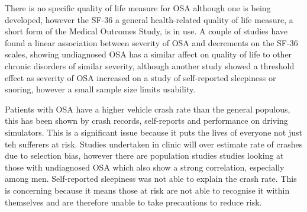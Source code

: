 There is no specific quality of life measure for OSA although one is being developed, however the SF-36 a general health-related quality of life measure, a short form of the Medical Outcomes Study, is in use. A couple of studies have found a linear association between severity of OSA and decrements on the SF-36 scales, showing undiagnosed OSA has a similar affect on quality of life to other chronic disorders of similar severity, although another study showed a threshold effect as severity of OSA increased on a study of self-reported sleepiness or snoring, however a small sample size limits usability. 

Patients with OSA have a higher vehicle crash rate than the general populous, this has been shown by crash records, self-reports and performance on driving simulators. This is a significant issue because it puts the lives of everyone not just teh sufferers at risk. Studies undertaken in clinic will over estimate rate of crashes due to selection bias, however there are population studies studies looking at those with undiagnosed OSA which also show a strong correlation, especially among men. Self-reported sleepiness was not able to explain the crash rate. This is concerning because it means those at risk are not able to recognise it within themselves and are therefore unable to take precautions to reduce risk. 
